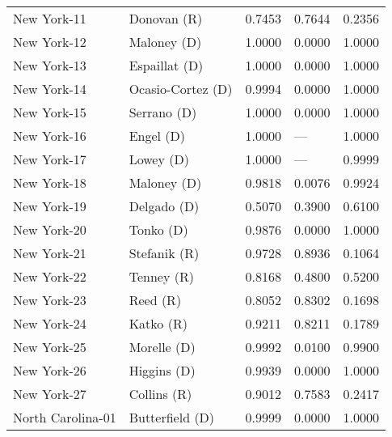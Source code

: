 \begin{longtable}{llrll}
       New York-11 &           {\color{Red} Donovan (R)} &       0.7453 &        0.7644 &        0.2356 \\
       New York-12 &          {\color{Blue} Maloney (D)} &       1.0000 &        0.0000 &        1.0000 \\
       New York-13 &        {\color{Blue} Espaillat (D)} &       1.0000 &        0.0000 &        1.0000 \\
       New York-14 &    {\color{Blue} Ocasio-Cortez (D)} &       0.9994 &        0.0000 &        1.0000 \\
       New York-15 &          {\color{Blue} Serrano (D)} &       1.0000 &        0.0000 &        1.0000 \\
       New York-16 &            {\color{Blue} Engel (D)} &       1.0000 &           --- &        1.0000 \\
       New York-17 &            {\color{Blue} Lowey (D)} &       1.0000 &           --- &        0.9999 \\
       New York-18 &          {\color{Blue} Maloney (D)} &       0.9818 &        0.0076 &        0.9924 \\
       New York-19 &          {\color{Blue} Delgado (D)} &       0.5070 &        0.3900 &        0.6100 \\
       New York-20 &            {\color{Blue} Tonko (D)} &       0.9876 &        0.0000 &        1.0000 \\
       New York-21 &          {\color{Red} Stefanik (R)} &       0.9728 &        0.8936 &        0.1064 \\
       New York-22 &            {\color{Red} Tenney (R)} &       0.8168 &        0.4800 &        0.5200 \\
       New York-23 &              {\color{Red} Reed (R)} &       0.8052 &        0.8302 &        0.1698 \\
       New York-24 &             {\color{Red} Katko (R)} &       0.9211 &        0.8211 &        0.1789 \\
       New York-25 &          {\color{Blue} Morelle (D)} &       0.9992 &        0.0100 &        0.9900 \\
       New York-26 &          {\color{Blue} Higgins (D)} &       0.9939 &        0.0000 &        1.0000 \\
       New York-27 &           {\color{Red} Collins (R)} &       0.9012 &        0.7583 &        0.2417 \\
 North Carolina-01 &      {\color{Blue} Butterfield (D)} &       0.9999 &        0.0000 &        1.0000 \\

\end{longtable}
